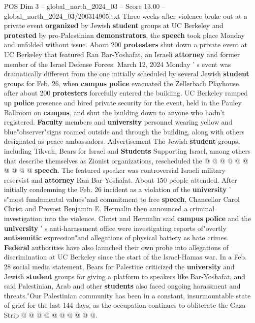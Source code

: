 \begin{textsample}{POS Dim 3 – global\_north\_2024\_03 – Score 13.00 – global\_north\_2024\_03/200314905.txt}  \label{ex:f3_pos_290}
Three weeks after violence broke out at a private event \textbf{organized} by Jewish \textbf{student} groups at UC Berkeley and \textbf{protested} by pro-Palestinian \textbf{demonstrators}, the \textbf{speech} took place Monday and unfolded without issue.
About 200 \textbf{protesters} shut down a private event at UC Berkeley that featured Ran Bar-Yoshafat, an Israeli \textbf{attorney} and former member of the Israel Defense Forces.
March 12, 2024 Monday ' s event was dramatically different from the one initially scheduled by several Jewish \textbf{student} groups for Feb. 26, when \textbf{campus} \textbf{police} evacuated the Zellerbach Playhouse after about 200 \textbf{protesters} forcefully entered the building.
UC Berkeley ramped up \textbf{police} presence and hired private security for the event, held in the Pauley Ballroom on \textbf{campus}, and shut the building down to anyone who hadn't registered. \textbf{Faculty} members and \textbf{university} personnel wearing yellow and blue"observer"signs roamed outside and through the building, along with others designated as peace ambassadors.
Advertisement The Jewish \textbf{student} groups, including Tikvah, Bears for Israel and \textbf{Students} Supporting Israel, among others that describe themselves as Zionist organizations, rescheduled the @ @ @ @ @ @ @ @ @ @ \textbf{speech}.
The featured speaker was controversial Israeli military reservist and \textbf{attorney} Ran Bar-Yoshafat.
About 150 people attended.
After initially condemning the Feb. 26 incident as a violation of the \textbf{university} ' s"most fundamental values"and commitment to free \textbf{speech}, Chancellor Carol Christ and Provost Benjamin E.
Hermalin then announced a criminal investigation into the violence.
Christ and Hermalin said \textbf{campus} \textbf{police} and the \textbf{university} ' s anti-harassment office were investigating reports of"overtly \textbf{antisemitic} expression"and allegations of physical battery as hate crimes. \textbf{Federal} authorities have also launched their own probe into allegations of discrimination at UC Berkeley since the start of the Israel-Hamas war.
In a Feb. 28 social media statement, Bears for Palestine criticized the \textbf{university} and Jewish \textbf{student} groups for giving a platform to speakers like Bar-Yoshafat, and said Palestinian, Arab and other \textbf{students} also faced ongoing harassment and threats."Our Palestinian community has been in a constant, insurmountable state of grief for the last 144 days, as the occupation continues to obliterate the Gaza Strip @ @ @ @ @ @ @ @ @ @.

\end{textsample}
